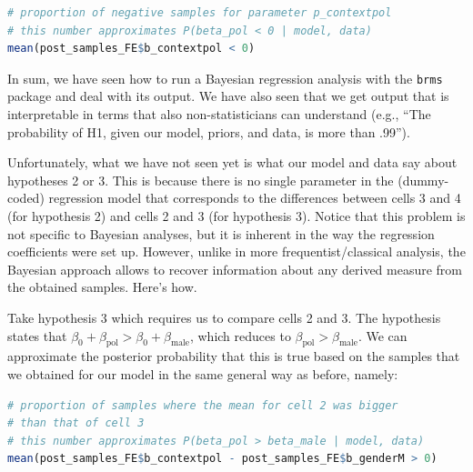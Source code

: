 \documentclass[nobib]{tufte-handout}
\begin{document}
\begin{minipage}[]{\textwidth}
\begin{lstlisting}[language=R]
# proportion of negative samples for parameter p_contextpol
# this number approximates P(beta_pol < 0 | model, data)
mean(post_samples_FE$b_contextpol < 0)
\end{lstlisting}
\end{minipage}

In sum, we have seen how to run a Bayesian regression analysis with the \texttt{brms} package and deal with its output. We have also seen that we get output that is interpretable in terms that also non-statisticians can understand (e.g., ``The probability of H1, given our model, priors, and data, is more than .99'').

Unfortunately, what we have not seen yet is what our model and data say about hypotheses 2 or 3. This is because there is no single parameter in the (dummy-coded) regression model that corresponds to the differences between cells 3 and 4 (for hypothesis 2) and cells 2 and 3 (for hypothesis 3). Notice that this problem is not specific to Bayesian analyses, but it is inherent in the way the regression coefficients were set up.
%
%
However, unlike in more frequentist/classical analysis, the Bayesian approach allows to recover information about any derived measure from the obtained samples. Here's how.

Take hypothesis 3 which requires us to compare cells 2 and 3. The hypothesis states that $\beta_0 + \beta_{\text{pol}} > \beta_0 + \beta_{\text{male}}$, which reduces to $\beta_{\text{pol}} > \beta_{\text{male}}$. We can approximate the posterior probability that this is true based on the samples that we obtained for our model in the same general way as before, namely:

\begin{minipage}[]{1.1\textwidth}
\begin{lstlisting}[language=R]
# proportion of samples where the mean for cell 2 was bigger 
# than that of cell 3 
# this number approximates P(beta_pol > beta_male | model, data)
mean(post_samples_FE$b_contextpol - post_samples_FE$b_genderM > 0)
\end{lstlisting}
\end{minipage}
\end{document}
